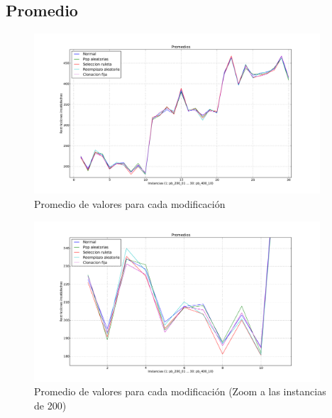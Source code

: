 \subsection{Promedio}

\begin{figure}[H]
\begin{center}
\includegraphics[width=0.95\textwidth]{img/promedio.pdf}
\end{center}
\caption{Promedio de valores para cada modificación}
\label{fig:promedio}
\end{figure}

\begin{figure}[H]
\begin{center}
\includegraphics[width=0.95\textwidth]{img/promedio-zoom200.pdf}
\end{center}
\caption{Promedio de valores para cada modificación (Zoom a las instancias de 200)}
\label{fig:promedio200}
\end{figure}

